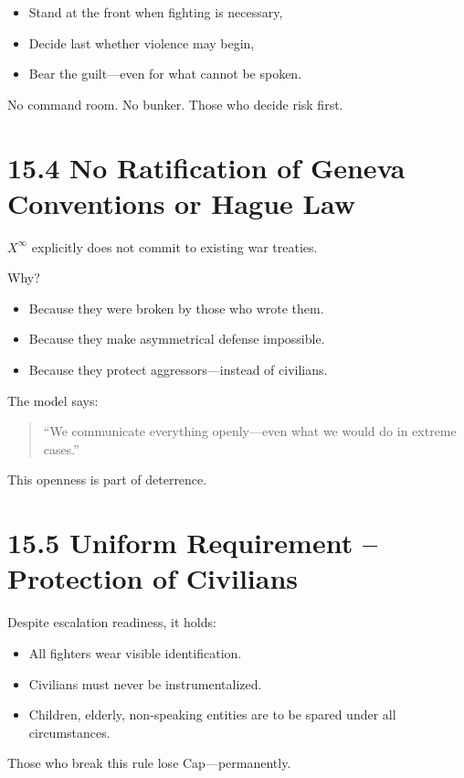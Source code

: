 \documentclass[12pt,a4paper]{book}
\begin{document}
\begin{itemize}
    \item Stand at the front when fighting is necessary,
    \item Decide last whether violence may begin,
    \item Bear the guilt—even for what cannot be spoken.
\end{itemize}

No command room. No bunker.  
Those who decide risk first.

\section*{15.4 No Ratification of Geneva Conventions or Hague Law}

$X^\infty$ explicitly does not commit to existing war treaties.

Why?

\begin{itemize}
    \item Because they were broken by those who wrote them.
    \item Because they make asymmetrical defense impossible.
    \item Because they protect aggressors—instead of civilians.
\end{itemize}

The model says:

\begin{quote}
“We communicate everything openly—even what we would do in extreme cases.”  
\end{quote}

This openness is part of deterrence.

\section*{15.5 Uniform Requirement – Protection of Civilians}

Despite escalation readiness, it holds:

\begin{itemize}
    \item All fighters wear visible identification.
    \item Civilians must never be instrumentalized.
    \item Children, elderly, non-speaking entities are to be spared under all circumstances.
\end{itemize}

Those who break this rule lose Cap—permanently.
\end{document}
